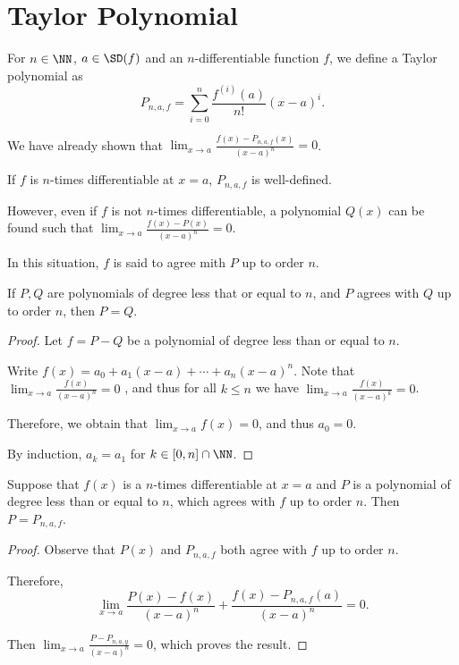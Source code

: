 \documentclass[11pt]{scrartcl}
\begin{document}
\section{Taylor Polynomial}

For $n\in\NN$, $a\in\SD(f)$ and an $n$-differentiable function $f$, we
define a Taylor polynomial as
\begin{equation*}
  P_{n, a, f} = \sum_{i=0}^n \frac{f^{(i)}(a)}{n!}(x-a)^i.
\end{equation*}

We have already shown that $\lim_{x\to a } \frac{f(x) - P_{n, a, f}(x)}{(x-a)^n} = 0$.

If $f$ is $n$-times differentiable at $x=a$, $P_{n,a, f}$ is well-defined.

However, even if $f$ is not $n$-times differentiable, a polynomial $Q(x)$ can
be found such that $\lim_{x\to a } \frac{f(x) - P(x)}{(x-a)^n} = 0$.

In this situation, $f$ is said to agree mith $P$ up to order $n$.

\begin{theorem}
  If $P, Q$ are polynomials of degree less that or equal to $n$, and $P$ agrees with $Q$ up to order $n$, then $P = Q$.
\end{theorem}

\begin{proof}
  \hfill

  Let $f = P - Q$ be a polynomial of degree less than or equal to $n$.

  Write $f(x) = a_0 + a_1(x-a) + \cdots +a_n(x-a)^n$. Note that
  $\lim_{x\to a} \frac{f(x)}{(x-a)^n} = 0$ , and thus for all
  $k\leq n$ we have $\lim_{x\to a} \frac{f(x)}{(x-a)^k} = 0$.

  Therefore, we obtain that $\lim_{x\to a} f(x) = 0$, and thus $a_0 =0$.

  By induction, $a_k= a_1$ for $k\in[0, n]\cap \NN$.
\end{proof}

\begin{corollary}
  Suppose that  $f(x)$ is a $n$-times differentiable at $x=a$ and $P$ is a polynomial of degree less than or equal to $n$, which agrees with $f$ up to order $n$. Then $P = P_{n, a, f}$.

  \begin{proof}
    \hfill

    Observe that $P(x)$ and  $P_{n, a, f}$ both agree with $f$ up to order $n$.

    Therefore, 
    \begin{equation*}
      \lim_{x\to a} \frac{P(x)-f(x)}{(x-a)^n} + \frac{f(x)-P_{n, a, f}(a)}{(x-a)^n} = 0.
    \end{equation*}

    Then $\lim_{x\to a} \frac{P-P_{n, a, y}}{(x-a)^n} = 0$, which proves the result.

  \end{proof}
\end{corollary}
\end{document}
